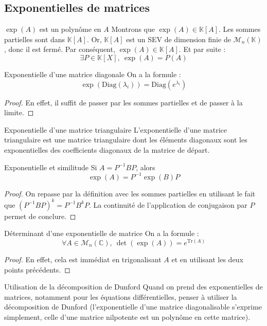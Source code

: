 \documentclass[french]{book}
\newcommand{\C}{\mathbb{C}}
\newcommand{\K}{\mathbb{K}}
\newcommand{\inv}{^{-1}}
\newcommand{\Tr}{\text{Tr}}
\theoremstyle{plain}
\theoremstyle{definition}
\theoremstyle{remark}
\begin{document}
\subsection{Exponentielles de matrices}
\begin{AS}{$\exp(A)$ est un polynôme en $A$} Montrons que $\exp(A)\in\K[A]$. Les sommes partielles sont dans $\K[A]$. Or, $\K[A]$ est un SEV de dimension finie de $\mathcal{M}_n(\K)$, donc il est fermé. Par conséquent, $\exp(A)\in\K[A]$. Et par suite : $$\exists P\in\K[X],\ \exp(A)=P(A)$$
\end{AS}
\begin{AS}{Exponentielle d'une matrice diagonale} On a la formule : $$\exp(\text{Diag}(\lambda_i))=\text{Diag}(e^{\lambda_i})$$
\end{AS} \begin{proof}
En effet, il suffit de passer par les sommes partielles et de passer à la limite.
\end{proof}
\begin{AS}{Exponentielle d'une matrice triangulaire} L'exponentielle d'une matrice triangulaire est une matrice triangulaire dont les éléments diagonaux sont les exponentielles des coefficients diagonaux de la matrice de départ.
\end{AS}
\begin{AS}{Exponentielle et similitude} Si $A=P\inv BP$, alors $$\exp(A)=P\inv\exp(B) P$$
\end{AS}
\begin{proof}
	On repasse par la définition avec les sommes partielles en utilisant le fait que $(P\inv BP)^k=P\inv B^kP$. La continuité de l'application de conjugaison par $P$ permet de conclure.
\end{proof}
\begin{AS}{Déterminant d'une exponentielle de matrice} On a la formule : $$\forall A\in\mathcal{M}_n(\C),\ \det(\exp(A))=e^{\Tr(A)}$$ 
\end{AS}
\begin{proof}
	En effet, cela est immédiat en trigonalisant $A$ et en utilisant les deux points précédents.
\end{proof}
\begin{AS}{Utilisation de la décomposition de Dunford} Quand on prend des exponentielles de matrices, notamment pour les équations différentielles, penser à utiliser la décomposition de Dunford (l’exponentielle d’une matrice diagonalisable s’exprime simplement, celle d’une matrice nilpotente est un polynôme en cette matrice).
\end{AS}
\end{document}
